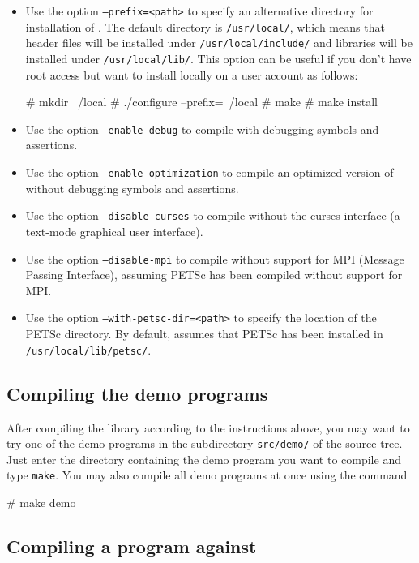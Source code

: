 \begin{itemize}
\item
  Use the option \texttt{--prefix=<path>} to specify an alternative
  directory for installation of \dolfin{}. The default directory is
  \texttt{/usr/local/}, which means that header files will be
  installed under \texttt{/usr/local/include/} and libraries will be
  installed under \texttt{/usr/local/lib/}. This option can be useful
  if you don't have root access but want to install \dolfin{} locally
  on a user account as follows:
  \begin{code}
    # mkdir ~/local
    # ./configure --prefix=~/local
    # make
    # make install
  \end{code}
\item
  Use the option \texttt{--enable-debug} to compile \dolfin{} with
  debugging symbols and assertions.
\item
  Use the option \texttt{--enable-optimization} to compile an
  optimized version of \dolfin{} without debugging symbols
  and assertions.
\item
  Use the option \texttt{--disable-curses} to compile \dolfin{}
  without the curses interface (a text-mode graphical user interface).
\item
  Use the option \texttt{--disable-mpi} to compile \dolfin{} without
  support for MPI (Message Passing Interface), assuming PETSc has been
  compiled without support for MPI.
\item
  Use the option \texttt{--with-petsc-dir=<path>} to specify the
  location of the PETSc directory. By default, \dolfin{} assumes that
  PETSc has been installed in \texttt{/usr/local/lib/petsc/}.
\end{itemize}

\subsection{Compiling the demo programs}

After compiling the \dolfin{} library according to the instructions
above, you may want to try one of the demo programs in the
subdirectory \texttt{src/demo/} of the \dolfin{} source tree.
Just enter the directory containing the demo program you want to
compile and type \texttt{make}. You may also compile all demo programs
at once using the command
\begin{code}
  # make demo
\end{code}

\subsection{Compiling a program against \dolfin{}}

